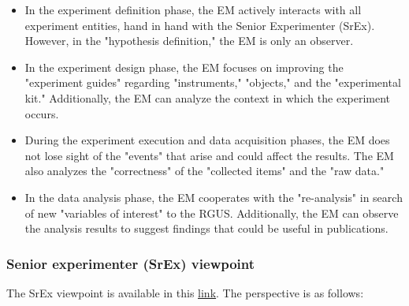 \begin{itemize}
	\item In the experiment definition phase, the EM actively interacts with all experiment entities, hand in hand with the Senior Experimenter (SrEx). However, in the "hypothesis definition," the EM is only an observer.
	\item In the experiment design phase, the EM focuses on improving the "experiment guides" regarding "instruments," "objects," and the "experimental kit." Additionally, the EM can analyze the context in which the experiment occurs.
	\item During the experiment execution and data acquisition phases, the EM does not lose sight of the "events" that arise and could affect the results. The EM also analyzes the "correctness" of the "collected items" and the "raw data."
	\item In the data analysis phase, the EM cooperates with the "re-analysis" in search of new "variables of interest" to the RGUS. Additionally, the EM can observe the analysis results to suggest findings that could be useful in publications.
\end{itemize}

\subsubsection{Senior experimenter (SrEx) viewpoint}
The SrEx viewpoint is available in this \href{https://zenodo.org/record/7102464#.Yyxl4ezMLUJ}{\ul{link}}. The perspective is as follows:

